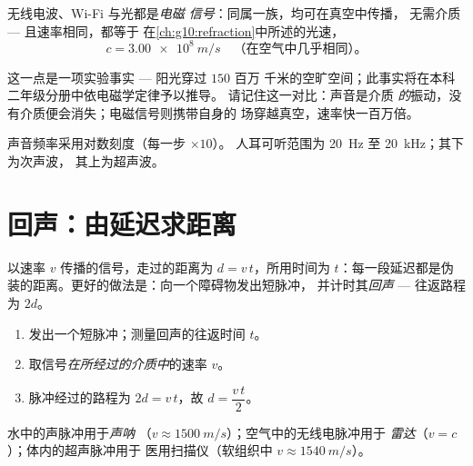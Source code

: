 \begin{proposition}[电磁信号]\label{prop:g10:signals-and-waves:em}
无线电波、Wi-Fi 与光都是\emph{电磁
信号}：同属一族，均可在真空中传播，
无需介质 --- 且速率相同，都等于
在\cref{ch:g10:refraction}中所述的光速，
\[
c = \qty{3.00e8}{m/s} \quad \text{（在空气中几乎相同）。}
\]
\end{proposition}
\admitted

\begin{remark}\label{rem:g10:signals-and-waves:honest}
这一点是一项实验事实 --- 阳光穿过 $150$ 百万
千米的空旷空间；此事实将在本科二年级分册中依电磁学定律予以推导。
请记住这一对比：声音是介质
\emph{的}振动，没有介质便会消失；电磁信号则携带自身的
场穿越真空，速率快一百万倍。
\end{remark}

\begin{omfigure}

{\small 声音频率采用对数刻度（每一步 $\times 10$）。
人耳可听范围为 \qty{20}{Hz} 至 \qty{20}{kHz}；其下为次声波，
其上为超声波。}
\end{omfigure}

\section{回声：由延迟求距离}

以速率 $v$ 传播的信号，走过的距离为 $d = v\,t$，所用时间为
$t$：每一段延迟都是伪装的距离。更好的做法是：向一个障碍物发出短脉冲，
并计时其\emph{回声} --- 往返路程为 $2d$。

\begin{method}[回声测距]\label{met:g10:signals-and-waves:echo}
\begin{enumerate}
  \item 发出一个短脉冲；测量回声的往返时间 $t$。
  \item 取信号\emph{在所经过的介质中}的速率 $v$。
  \item 脉冲经过的路程为 $2d = v\,t$，故 $d = \dfrac{v\,t}{2}$。
\end{enumerate}
水中的声脉冲用于\emph{声呐}
（$v \approx \qty{1500}{m/s}$）；空气中的无线电脉冲用于
\emph{雷达}（$v = c$）；体内的超声脉冲用于
医用扫描仪（软组织中 $v \approx \qty{1540}{m/s}$）。
\end{method}


